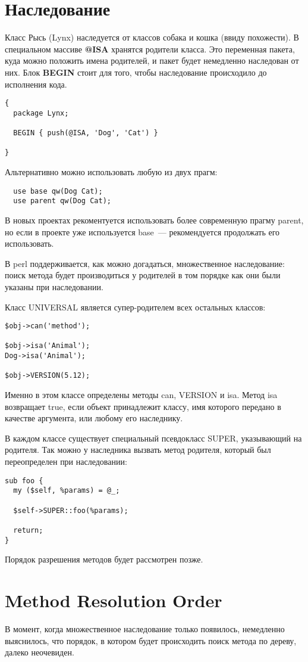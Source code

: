 \section{Наследование}%
Класс Рысь (Lynx) наследуется от классов собака и кошка (ввиду похожести). В специальном массиве \textbf{@ISA} хранятся родители класса. Это переменная пакета, куда можно положить имена родителей, и пакет будет немедленно наследован от них. Блок \textbf{BEGIN} стоит для того, чтобы наследование происходило до исполнения кода.
\begin{verbatim}
{
  package Lynx;

  BEGIN { push(@ISA, 'Dog', 'Cat') }

}
\end{verbatim}
Альтернативно можно использовать любую из двух прагм:
\begin{verbatim}
  use base qw(Dog Cat);
  use parent qw(Dog Cat);
\end{verbatim}
В новых проектах рекоментуется использовать более современную прагму parent, но если в проекте уже используется base~--- рекомендуется продолжать его использовать.

В perl поддерживается, как можно догадаться, множественное наследование: поиск метода будет производиться у родителей в том порядке как они были указаны при наследовании.

Класс UNIVERSAL является супер-родителем всех остальных классов:
\begin{verbatim}
$obj->can('method');

$obj->isa('Animal');
Dog->isa('Animal');

$obj->VERSION(5.12);
\end{verbatim}
Именно в этом классе определены методы can, VERSION и isa. Метод isa возвращает true, если объект принадлежит классу, имя которого передано в качестве аргумента, или любому его наследнику.

В каждом классе существует специальный псевдокласс SUPER, указывающий на родителя. Так можно у наследника вызвать метод родителя, который был переопределен при наследовании:
\begin{verbatim}
sub foo {
  my ($self, %params) = @_;

  $self->SUPER::foo(%params);

  return;
}
\end{verbatim}
Порядок разрешения методов будет рассмотрен позже.

\section{Method Resolution Order}%
В момент, когда множественное наследование только появилось, немедленно выяснилось, что порядок, в котором будет происходить поиск метода по дереву, далеко неочевиден.

